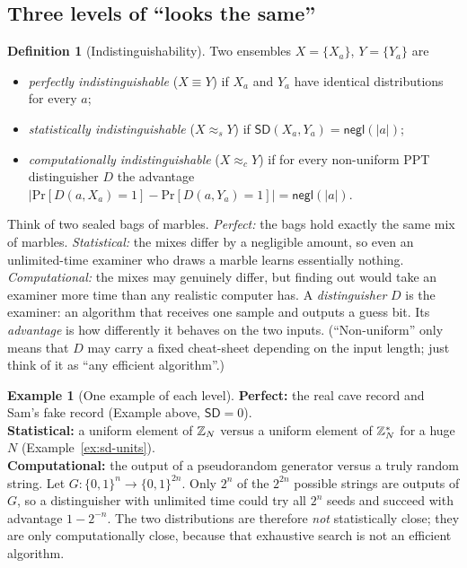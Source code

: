 \documentclass[11pt,a4paper]{report}
\theoremstyle{plain}
\theoremstyle{definition}
\newtheorem{definition}[theorem]{Definition}
\newtheorem{example}[theorem]{Example}
\theoremstyle{remark}
\newcommand{\negl}{\mathsf{negl}}
\renewcommand{\Pr}{\mathrm{Pr}}
\newcommand{\SD}{\mathsf{SD}}
\newcommand{\Z}[1]{\ZZ_{#1}}
\newcommand{\Zs}[1]{\ZZ_{#1}^{*}}
\begin{document}
\subsection{Three levels of ``looks the same''}
\begin{definition}[Indistinguishability]
Two ensembles $X=\{X_a\}$, $Y=\{Y_a\}$ are
\begin{itemize}
\item \emph{perfectly indistinguishable} ($X\equiv Y$) if $X_a$ and $Y_a$ have identical distributions for every $a$;
\item \emph{statistically indistinguishable} ($X\approx_s Y$) if $\SD(X_a,Y_a)=\negl(|a|)$;
\item \emph{computationally indistinguishable} ($X\approx_c Y$) if for every non-uniform PPT distinguisher $D$ the advantage $\big|\Pr[D(a,X_a)=1]-\Pr[D(a,Y_a)=1]\big|=\negl(|a|)$.
\end{itemize}
\end{definition}
\begin{plain}\PE
Think of two sealed bags of marbles.
\emph{Perfect:} the bags hold exactly the same mix of marbles.
\emph{Statistical:} the mixes differ by a negligible amount, so even an unlimited-time examiner who draws a marble learns essentially nothing.
\emph{Computational:} the mixes may genuinely differ, but finding out would take an examiner more time than any realistic computer has.
A \emph{distinguisher} $D$ is the examiner: an algorithm that receives one sample and outputs a guess bit. Its \emph{advantage} is how differently it behaves on the two inputs. (``Non-uniform'' only means that $D$ may carry a fixed cheat-sheet depending on the input length; just think of it as ``any efficient algorithm''.)
\end{plain}

\begin{example}[One example of each level]\label{ex:three-levels}
\textbf{Perfect:} the real cave record and Sam's fake record (Example above, $\SD=0$).\\
\textbf{Statistical:} a uniform element of $\Z N$ versus a uniform element of $\Zs N$ for a huge $N$ (Example~\ref{ex:sd-units}).\\
\textbf{Computational:} the output of a pseudorandom generator versus a truly random string. Let $G:\{0,1\}^n\to\{0,1\}^{2n}$. Only $2^n$ of the $2^{2n}$ possible strings are outputs of $G$, so a distinguisher with unlimited time could try all $2^n$ seeds and succeed with advantage $1-2^{-n}$. The two distributions are therefore \emph{not} statistically close; they are only computationally close, because that exhaustive search is not an efficient algorithm.
\end{example}
\end{document}
